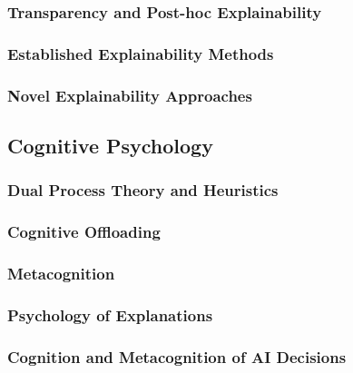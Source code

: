 \subsubsection{Transparency and Post-hoc Explainability} \label{sssec:transparency_posthoc}

\subsubsection{Established Explainability Methods} \label{sssec:established_methods}

\cite{Ribeiro2016}

\cite{Lundberg2017}

\subsubsection{Novel Explainability Approaches} \label{sssec:novel_approaches}

\cite{Martens2025}

\subsection{Cognitive Psychology} \label{ssec:cognitive_psychology}

\subsubsection{Dual Process Theory and Heuristics} \label{sssec:dual_process}

\cite{Kahnemann2011}

\subsubsection{Cognitive Offloading} \label{sssec:cognitive_offloading}

\subsubsection{Metacognition} \label{sssec:metacognition}

\subsubsection{Psychology of Explanations} \label{sssec:psychology_explanations}

\cite{Miller2019}

\subsubsection {Cognition and Metacognition of AI Decisions} \label{sssec:cognition_metacognition_ai}

\cite{Jussupow2021}

\cite{Shin2021}
